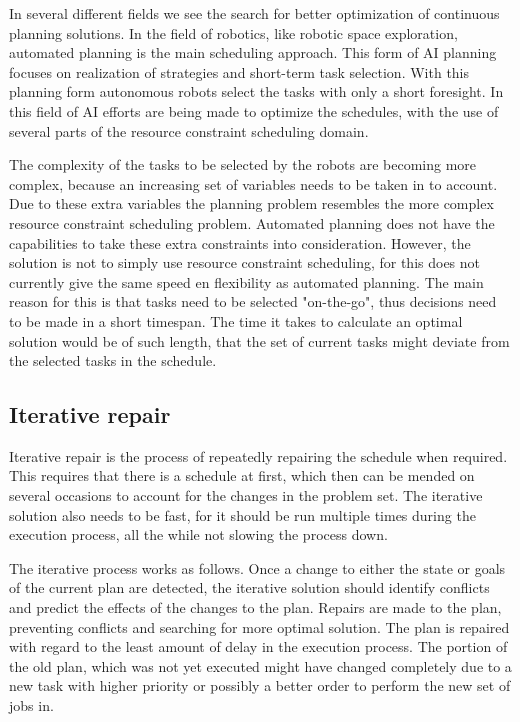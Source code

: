 \documentclass{article}
\begin{document}
In several different fields we see the search for better optimization of continuous planning solutions.
In the field of robotics, like robotic space exploration, automated planning is the main scheduling approach.
This form of AI planning focuses on realization of strategies and short-term task selection.
With this planning form autonomous robots select the tasks with only a short foresight.
In this field of AI efforts are being made to optimize the schedules, with the use of several parts of the resource constraint scheduling domain.
\cite{smith00}

The complexity of the tasks to be selected by the robots are becoming more complex, because an increasing set of variables needs to be taken in to account.
Due to these extra variables the planning problem resembles the more complex resource constraint scheduling problem.
Automated planning does not have the capabilities to take these extra constraints into consideration.
However, the solution is not to simply use resource constraint scheduling, for this does not currently give the same speed en flexibility as automated planning.
The main reason for this is that tasks need to be selected "on-the-go", thus decisions need to be made in a short timespan.
The time it takes to calculate an optimal solution would be of such length, that the set of current tasks might deviate from the selected tasks in the schedule.

\subsection{Iterative repair}
Iterative repair is the process of repeatedly repairing the schedule when required.
This requires that there is a schedule at first, which then can be mended on several occasions to account for the changes in the problem set.
The iterative solution also needs to be fast, for it should be run multiple times during the execution process, all the while not slowing the process down.

The iterative process works as follows.
Once a change to either the state or goals of the current plan are detected, the iterative solution should identify conflicts and predict the effects of the changes to the plan.
Repairs are made to the plan, preventing conflicts and searching for more optimal solution.
The plan is repaired with regard to the least amount of delay in the execution process.
The portion of the old plan, which was not yet executed might have changed completely due to a new task with higher priority or possibly a better order to perform the new set of jobs in.
\cite{chien00}
\end{document}
